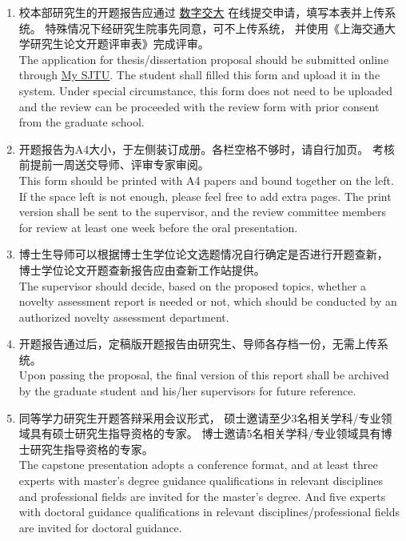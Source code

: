 \documentclass[a4paper,zihao=-4,AutoFakeBold]{ctexart}
\begin{document}
\begin{enumerate}
    \fangsong
    \item 校本部研究生的开题报告应通过%
          \href{http://my.sjtu.edu.cn/}{\color{blue}\underline{数字交大}}%
          在线提交申请，填写本表并上传系统。
          特殊情况下经研究生院事先同意，可不上传系统，
          并使用《上海交通大学研究生论文开题评审表》完成评审。
          \\[0.5\baselineskip]
          The application for thesis/dissertation proposal
          should be submitted online through
          \href{http://my.sjtu.edu.cn/}{\color{blue}\underline{My SJTU}}.
          The student shall filled this form and upload it in the system.
          Under special circumstance,
          this form does not need to be uploaded
          and the review can be proceeded with the review form
          with prior consent from the graduate school.

    \item 开题报告为A4大小，于左侧装订成册。各栏空格不够时，请自行加页。
          考核前提前一周送交导师、评审专家审阅。
          \\[0.5\baselineskip]
          This form should be printed with A4 papers
          and bound together on the left.
          If the space left is not enough,
          please feel free to add extra pages.
          The print version shall be sent to the supervisor,
          and the review committee members for review
          at least one week before the oral presentation.

    \item 博士生导师可以根据博士生学位论文选题情况自行确定是否进行开题查新，
          博士学位论文开题查新报告应由查新工作站提供。
          \\[0.5\baselineskip]
          The supervisor should decide, based on the proposed topics,
          whether a novelty assessment report is needed or not,
          which should be conducted by an authorized
          novelty assessment department.

    \item 开题报告通过后，定稿版开题报告由研究生、导师各存档一份，无需上传系统。
          \\[0.5\baselineskip]
          Upon passing the proposal,
          the final version of this report shall be archived by the
          graduate student and his/her supervisors for future reference.

    \item 同等学力研究生开题答辩采用会议形式，
          硕士邀请至少3名相关学科/专业领域具有硕士研究生指导资格的专家。
          博士邀请5名相关学科/专业领域具有博士研究生指导资格的专家。
          \\[0.5\baselineskip]
          The capstone presentation adopts a conference format,
          and at least three experts with master's degree guidance
          qualifications in relevant disciplines and professional fields
          are invited for the master's degree.
          And five experts with doctoral guidance qualifications
          in relevant disciplines/professional fields are invited
          for doctoral guidance.
\end{enumerate}
\end{document}
